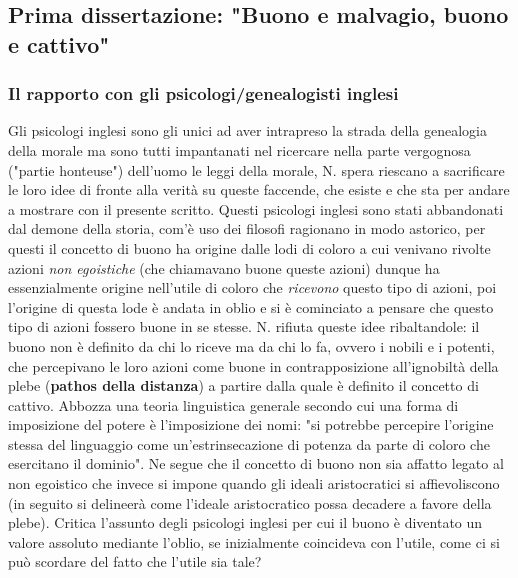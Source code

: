 \documentclass[10pt,a4paper]{article}
\begin{document}
\subsection{Prima dissertazione: "Buono e malvagio, buono e cattivo"}
\subsubsection{Il rapporto con gli psicologi/genealogisti inglesi}
Gli psicologi inglesi sono gli unici ad aver intrapreso la strada della genealogia della morale ma sono tutti impantanati nel ricercare nella parte vergognosa ("partie honteuse") dell'uomo le leggi della morale, N. spera riescano a sacrificare le loro idee di fronte alla verità su queste faccende, che esiste e che sta per andare a mostrare con il presente scritto. Questi psicologi inglesi sono stati abbandonati dal demone della storia, com'è uso dei filosofi ragionano in modo astorico, per questi il concetto di buono ha origine dalle lodi di coloro a cui venivano rivolte azioni \textit{non egoistiche} (che chiamavano buone queste azioni) dunque ha essenzialmente origine nell'utile di coloro che \textit{ricevono} questo tipo di azioni, poi l'origine di questa lode è andata in oblio e si è cominciato a pensare che questo tipo di azioni fossero buone in se stesse. N. rifiuta queste idee ribaltandole: il buono non è definito da chi lo riceve ma da chi lo fa, ovvero i nobili e i potenti, che percepivano le loro azioni come buone in contrapposizione all'ignobiltà della plebe (\textbf{pathos della distanza}) a partire dalla quale è definito il concetto di cattivo. Abbozza una teoria linguistica generale secondo cui una forma di imposizione del potere è l'imposizione dei nomi: "si potrebbe percepire l'origine stessa del linguaggio come un'estrinsecazione di potenza da parte di coloro che esercitano il dominio". Ne segue che il concetto di buono non sia affatto legato al non egoistico che invece si impone quando gli ideali aristocratici si affievoliscono (in seguito si delineerà come l'ideale aristocratico possa decadere a favore della plebe). Critica l'assunto degli psicologi inglesi per cui il buono è diventato un valore assoluto mediante l'oblio, se inizialmente coincideva con l'utile, come ci si può scordare del fatto che l'utile sia tale?
\end{document}
